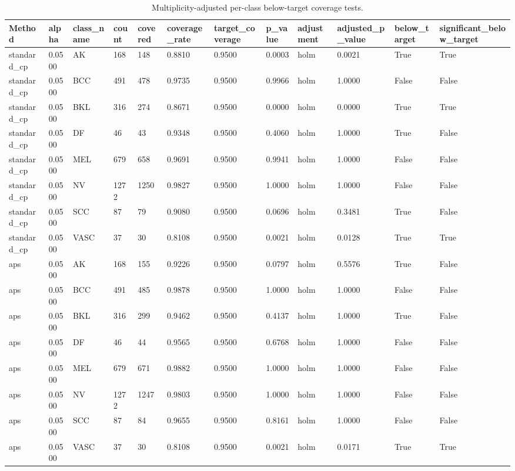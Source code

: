\begin{table}[htbp]
\centering
\caption{Multiplicity-adjusted per-class below-target coverage tests.}
\label{tab:per\_class\_tests}
\begin{tabular}{llllllllllll}
\hline
Method & alpha & class\_name & count & covered & coverage\_rate & target\_coverage & p\_value & adjustment & adjusted\_p\_value & below\_target & significant\_below\_target \\
\hline
standard\_cp & 0.0500 & AK & 168 & 148 & 0.8810 & 0.9500 & 0.0003 & holm & 0.0021 & True & True \\
standard\_cp & 0.0500 & BCC & 491 & 478 & 0.9735 & 0.9500 & 0.9966 & holm & 1.0000 & False & False \\
standard\_cp & 0.0500 & BKL & 316 & 274 & 0.8671 & 0.9500 & 0.0000 & holm & 0.0000 & True & True \\
standard\_cp & 0.0500 & DF & 46 & 43 & 0.9348 & 0.9500 & 0.4060 & holm & 1.0000 & True & False \\
standard\_cp & 0.0500 & MEL & 679 & 658 & 0.9691 & 0.9500 & 0.9941 & holm & 1.0000 & False & False \\
standard\_cp & 0.0500 & NV & 1272 & 1250 & 0.9827 & 0.9500 & 1.0000 & holm & 1.0000 & False & False \\
standard\_cp & 0.0500 & SCC & 87 & 79 & 0.9080 & 0.9500 & 0.0696 & holm & 0.3481 & True & False \\
standard\_cp & 0.0500 & VASC & 37 & 30 & 0.8108 & 0.9500 & 0.0021 & holm & 0.0128 & True & True \\
aps & 0.0500 & AK & 168 & 155 & 0.9226 & 0.9500 & 0.0797 & holm & 0.5576 & True & False \\
aps & 0.0500 & BCC & 491 & 485 & 0.9878 & 0.9500 & 1.0000 & holm & 1.0000 & False & False \\
aps & 0.0500 & BKL & 316 & 299 & 0.9462 & 0.9500 & 0.4137 & holm & 1.0000 & True & False \\
aps & 0.0500 & DF & 46 & 44 & 0.9565 & 0.9500 & 0.6768 & holm & 1.0000 & False & False \\
aps & 0.0500 & MEL & 679 & 671 & 0.9882 & 0.9500 & 1.0000 & holm & 1.0000 & False & False \\
aps & 0.0500 & NV & 1272 & 1247 & 0.9803 & 0.9500 & 1.0000 & holm & 1.0000 & False & False \\
aps & 0.0500 & SCC & 87 & 84 & 0.9655 & 0.9500 & 0.8161 & holm & 1.0000 & False & False \\
aps & 0.0500 & VASC & 37 & 30 & 0.8108 & 0.9500 & 0.0021 & holm & 0.0171 & True & True \\

\end{tabular}
\end{table}
